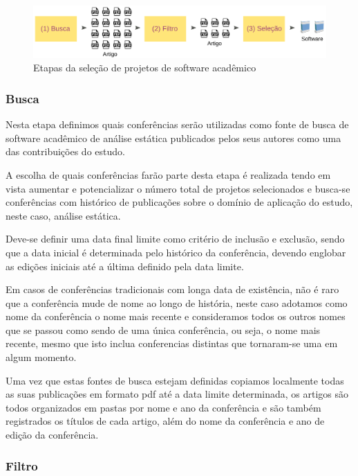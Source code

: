 \begin{figure}[h]
  \center
  \includegraphics[scale=0.21]{imagens/etapas-selecao-software.png}
  \caption{Etapas da seleção de projetos de software acadêmico}
  \label{etapas-selecao-software}
\end{figure}

\subsubsection{Busca}

Nesta etapa definimos quais conferências serão utilizadas como fonte de busca
de software acadêmico de análise estática publicados pelos seus autores como
uma das contribuições do estudo.

A escolha de quais conferências farão parte desta etapa é realizada tendo em
vista aumentar e potencializar o número total de projetos selecionados e
busca-se conferências com histórico de publicações sobre o domínio de aplicação
do estudo, neste caso, análise estática.

Deve-se definir uma data final limite como critério de inclusão e exclusão,
sendo que a data inicial é determinada pelo histórico da conferência, devendo
englobar as edições iniciais até a última definido pela data limite.

Em casos de conferências tradicionais com longa data de existência, não é raro
que a conferência mude de nome ao longo de história, neste caso adotamos como
nome da conferência o nome mais recente e consideramos todos os outros nomes
que se passou como sendo de uma única conferência, ou seja, o nome mais
recente, mesmo que isto inclua conferencias distintas que tornaram-se uma em
algum momento.

Uma vez que estas fontes de busca estejam definidas copiamos localmente todas
as suas publicações em formato pdf até a data limite determinada, os artigos
são todos organizados em pastas por nome e ano da conferência e são também
registrados os títulos de cada artigo, além do nome da conferência e ano de
edição da conferência.

\subsubsection{Filtro}

